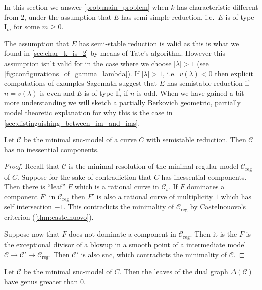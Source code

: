 In this section we answer \cref{prob:main_problem} when $k$ has characteristic different from $2$, under the assumption that $E$ has semi-simple reduction, i.e.\  $E$ is of type $\mathrm I_m$ for some $m \ge 0$. 

\begin{remark}\label{rem:justification_semistable}
	The assumption that $E$ has semi-stable reduction is valid as this is what we found in \cref{sec:char_k_is_2} by means of Tate's algorithm. 
	However this assumption isn't valid for in the case where we choose $|\lambda| > 1$ (see \cref{fig:configurations_of_gamma_lambda}).
	If $|\lambda| > 1$, i.e.\ $v(\lambda) < 0$ then
	explicit computations of examples Sagemath suggest that  $E$ has semistable reduction if $n = v(\lambda)$ is even and $E$ is of type $\mathrm I^*_n$ if $n$ is odd. 
	When we have gained a bit more understanding we will sketch a partially Berkovich geometric, partially model theoretic explanation for why this is the case in \cref{sec:distinguishing_between_im_and_ims}. 
\end{remark}

\begin{lemma}\label{lem:semistable_skeleton}
	Let $\mathscr C$ be the minimal snc-model of a curve $C$ with semistable reduction.
	Then $\mathscr C$ has no inessential components. 
\end{lemma}
\begin{proof}
	Recall that $\mathscr C$ is the minimal resolution of the minimal regular model $\mathscr C_\text{reg} $ of $C$. 
	Suppose for the sake of contradiction that  $C$ has inessential components.
	Then there is ``leaf''  $F$ which is a rational curve in $\mathscr C_s$. 
	If $F$ dominates a component $F'$ in $\mathscr C_\text{reg} $ then $F'$ is also a rational curve of multiplicity $1$ which has self intersection $-1$.
	This contradicts the minimality of  $\mathscr C _\text{reg} $ by Castelnouovo's criterion (\cref{thm:castelnuovo}). 

	Suppose now that $F$ does not dominate a component in $\mathscr C_\text{reg} $.
	Then it is the $F$ is the exceptional divisor of a blowup in a smooth point of a intermediate model $\mathscr C \to \mathscr C' \to \mathscr C_\text{reg} $. 
	Then $\mathscr C'$ is also snc, which contradicts the minimality of $\mathscr C$. 
\end{proof}
\begin{corollary}
	Let $\mathscr C$ be the minimal snc-model of $C$. 
	Then the leaves of the dual graph  $\Delta (\mathscr C)$ have genus greater than $0$. 
\end{corollary}

